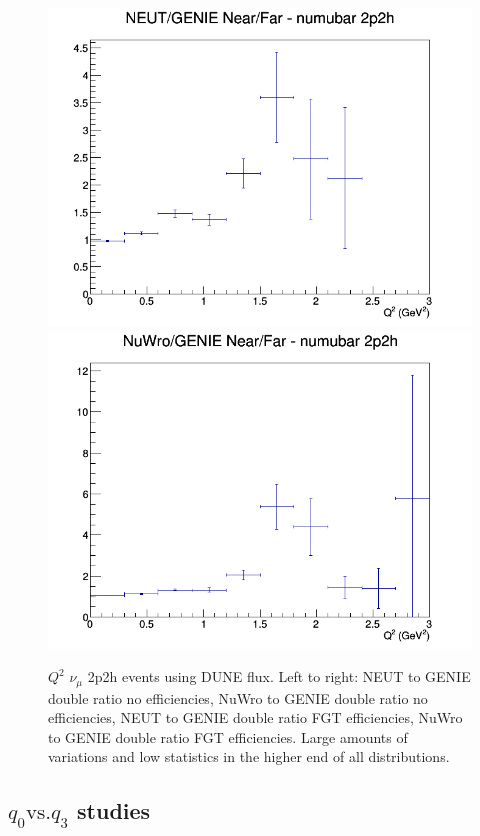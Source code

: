 \documentclass[12pt]{article}
\begin{document}
\begin{figure}[h]
\endminipage
{}
\includegraphics[width=\linewidth]{eff_Q2/FGT/ratios/2p2h_NEUT_GENIE_numubar_NF_Q2.png}
\endminipage
{}
\includegraphics[width=\linewidth]{eff_Q2/FGT/ratios/2p2h_NuWro_GENIE_numubar_NF_Q2.png}
\endminipage
\caption{$Q^2$ $\nu_{\mu}$ 2p2h events using DUNE flux. Left to right: NEUT to GENIE double ratio no efficiencies, NuWro to GENIE double ratio no efficiencies, NEUT to GENIE double ratio FGT efficiencies, NuWro to GENIE double ratio FGT efficiencies. Large amounts of variations and low statistics in the higher end of all distributions.}
\label{fig:Q2_2p2h}
\end{figure}
\FloatBarrier


\subsection{$q_0 \textrm{vs.} q_3$ studies}
\end{document}
